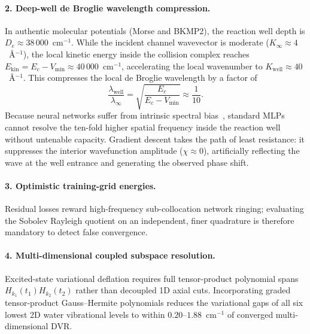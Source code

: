 \documentclass[11pt,a4paper]{article}
\newcommand{\cmi}{\ensuremath{\mathrm{cm}^{-1}}}
\begin{document}
\paragraph{2. Deep-well de Broglie wavelength compression.}
In authentic molecular potentials (Morse and BKMP2), the reaction well depth is
$D_e \approx 38\,000$~\cmi{}. While the incident channel wavevector is moderate
($K_\infty \approx 4$~\AA$^{-1}$), the local kinetic energy inside the collision complex
reaches $E_{\mathrm{kin}} = E_c - V_{\mathrm{min}} \approx 40\,000$~\cmi{}, accelerating the
local wavenumber to $K_{\mathrm{well}} \approx 40$~\AA$^{-1}$. This compresses the local
de Broglie wavelength by a factor of
\begin{equation}
 \frac{\lambda_{\mathrm{well}}}{\lambda_\infty} = \sqrt{\frac{E_c}{E_c - V_{\mathrm{min}}}} \approx \frac{1}{10} .
\end{equation}
Because neural networks suffer from intrinsic spectral bias~\cite{tancik2021}, standard
MLPs cannot resolve the ten-fold higher spatial frequency inside the reaction well without
untenable capacity. Gradient descent takes the path of least resistance: it suppresses
the interior wavefunction amplitude ($\chi \approx 0$), artificially reflecting the wave at
the well entrance and generating the observed phase shift.

\paragraph{3. Optimistic training-grid energies.}
Residual losses reward high-frequency sub-collocation network ringing;
evaluating the Sobolev Rayleigh quotient on an independent, finer quadrature is therefore
mandatory to detect false convergence.

\paragraph{4. Multi-dimensional coupled subspace resolution.}
Excited-state variational deflation requires full tensor-product polynomial spans
$H_{k_1}(t_1) H_{k_2}(t_2)$ rather than decoupled 1D axial cuts. Incorporating graded
tensor-product Gauss--Hermite polynomials reduces the variational gaps of all six lowest 2D
water vibrational levels to within $0.20$--$1.88$~\cmi{} of converged multi-dimensional DVR.
\end{document}

